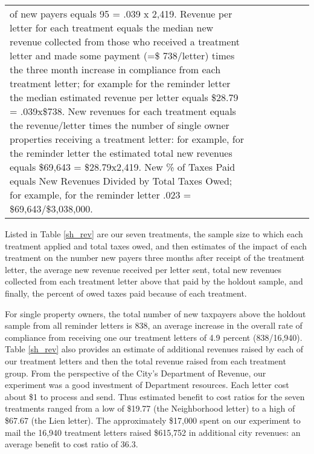 \begin{table}[htb]
\begin{adjustbox}{width=\textwidth,totalheight=.9\textheight,keepaspectratio}
\begin{tabular}{lcccccc}
{  of new payers equals 95 = .039 x 2,419.  Revenue per letter for each
  treatment equals the median new revenue collected from those who
  received a treatment letter and made some payment (=\$ 738/letter)
  times the three month increase in compliance from each treatment
  letter; for example for the reminder letter the median estimated
  revenue per letter equals \$28.79 = .039x\$738.  New revenues for
  each treatment equals the revenue/letter times the number of single
  owner properties receiving a treatment letter: for example, for the
  reminder letter the estimated total new revenues equals \$69,643 =
  \$28.79x2,419.  New \% of Taxes Paid equals New Revenues Divided by
  Total Taxes Owed; for example, for the reminder letter .023 =
  \$69,643/\$3,038,000.}
\end{tabular}
\end{adjustbox}
\end{table}

Listed in Table \ref{sh_rev} are our seven treatments, the sample size
to which each treatment applied and total taxes owed, and then
estimates of the impact of each treatment on the number new payers
three months after receipt of the treatment letter, the average new
revenue received per letter sent, total new revenues collected from
each treatment letter above that paid by the holdout sample, and
finally, the percent of owed taxes paid because of each treatment.

For single property owners, the total number of new taxpayers above
the holdout sample from all reminder letters is 838, an average
increase in the overall rate of compliance from receiving one our
treatment letters of 4.9 percent (838/16,940).  Table \ref{sh_rev}
also provides an estimate of additional revenues raised by each of our
treatment letters and then the total revenue raised from each
treatment group.  From the perspective of the City's Department of
Revenue, our experiment was a good investment of Department resources.
Each letter cost about \$1 to process and send.  Thus estimated
benefit to cost ratios for the seven treatments ranged from a low of
\$19.77 (the Neighborhood letter) to a high of \$67.67 (the Lien
letter).  The approximately \$17,000 spent on our experiment to mail
the 16,940 treatment letters raised \$615,752 in additional city
revenues: an average benefit to cost ratio of 36.3.

